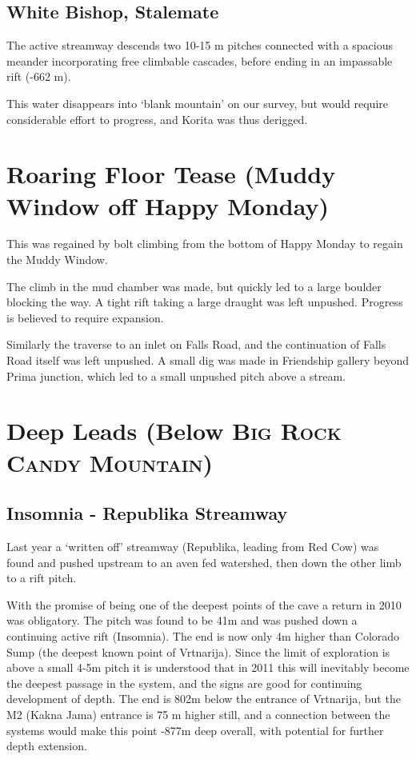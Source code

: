 \subsection{White Bishop, Stalemate}\label{white-bishop-stalemate}

The active streamway descends two 10-15 m pitches connected with a
spacious meander incorporating free climbable cascades, before ending in
an impassable rift (-662 m).

This water disappears into `blank mountain' on our survey, but would
require considerable effort to progress, and Korita was thus derigged.

\section{Roaring Floor Tease (Muddy Window off Happy
Monday)}\label{roaring-floor-tease-muddy-window-off-happy-monday}

This was regained by bolt climbing from the bottom of Happy Monday to
regain the Muddy Window.

The climb in the mud chamber was made, but quickly led to a large
boulder blocking the way. A tight rift taking a large draught was left
unpushed. Progress is believed to require expansion.

Similarly the traverse to an inlet on Falls Road, and the continuation
of Falls Road itself was left unpushed. A small dig was made in
Friendship gallery beyond Prima junction, which led to a small unpushed
pitch above a stream.

\section{\texorpdfstring{Deep Leads (Below
\textsc{Big Rock Candy Mountain})}{Deep Leads (Below )}}\label{deep-leads-below}

\subsection{Insomnia - Republika
Streamway}\label{insomnia---republika-streamway}

Last year a `written off' streamway (Republika, leading from Red Cow)
was found and pushed upstream to an aven fed watershed, then down the
other limb to a rift pitch.

With the promise of being one of the deepest points of the cave a return
in 2010 was obligatory. The pitch was found to be 41m and was pushed
down a continuing active rift (Insomnia). The end is now only 4m higher
than Colorado Sump (the deepest known point of Vrtnarija). Since the
limit of exploration is above a small 4-5m pitch it is understood that
in 2011 this will inevitably become the deepest passage in the system,
and the signs are good for continuing development of depth. The end is
802m below the entrance of Vrtnarija, but the M2 (Kakna Jama) entrance
is 75 m higher still, and a connection between the systems would make
this point -877m deep overall, with potential for further depth
extension.

